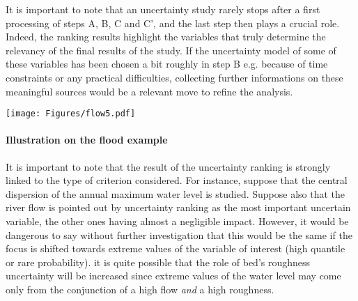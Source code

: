 It is important to note that an uncertainty study rarely stops after a first processing of steps A, B, C and C', and the last step then plays a crucial role. Indeed, the ranking results highlight the variables that truly determine the relevancy of the final results of the study. If the uncertainty model of some of these variables has been chosen a bit roughly in step B e.g. because of time constraints or any practical difficulties, collecting further informations on these meaningful sources would be a relevant move to refine the analysis.

\begin{center}
  \texttt{[image: Figures/flow5.pdf]}
\end{center}

\paragraph{Illustration on the flood example}
\par

It is important to note that the result of the uncertainty ranking is strongly linked to the type of criterion considered. For instance, suppose that the central dispersion of the annual maximum water level is studied. Suppose also that the river flow is pointed out by uncertainty ranking as the most important uncertain variable, the other ones having almost a negligible impact. However, it would be dangerous to say without further investigation that this would be the same if the focus is shifted towards extreme values of the variable of interest (high quantile or rare probability). it is quite possible that the role of bed's roughness uncertainty will be increased since extreme values of the water level may come only from the conjunction of a high flow {\em and} a high roughness.
